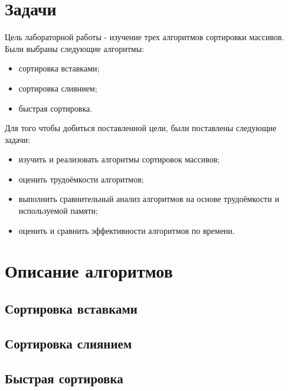 \documentclass[12pt, a4paper]{report}
\begin{document}
	\section{Задачи}
	Цель лабораторной работы - изучение трех алгоритмов сортировки массивов. Были выбраны следующие алгоритмы:
	\begin{itemize}
		\item сортировка вставками;
		\item сортировка слиянием;
		\item быстрая сортировка.
	\end{itemize}
	Для того чтобы добиться поставленной цели, были поставлены следующие задачи:
	\begin{itemize}
		\item изучить и реализовать алгоритмы сортировок массивов;
		\item оценить трудоёмкости алгоритмов;
		\item выполнить сравнительный анализ алгоритмов на основе трудоёмкости и используемой памяти;
		\item оценить и сравнить эффективности алгоритмов по времени.
	\end{itemize}

	\section{Описание алгоритмов}
	
	\subsection{Сортировка вставками}

	\subsection{Сортировка слиянием}
	
	\subsection{Быстрая сортировка}
	
\end{document}
